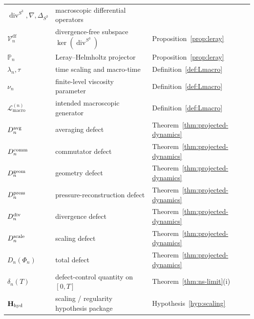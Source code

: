 \documentclass[11pt, a4paper]{amsart}
\theoremstyle{definition}
\newcommand{\Lmacro}{\mathcal L_{\mathrm{macro}}}
\newcommand{\divS}{\operatorname{div}^{S^3}}
\newcommand{\LapS}{\Delta_{S^3}}
\newcommand{\Projn}{\mathbb P_n}
\newcommand{\Vdf}{\mathcal V_n^{\mathrm{df}}}
\begin{document}
\begin{center}
\begin{tabular}{|l|l|l|}
$\divS, \nabla, \LapS$ & macroscopic differential operators
  & \\
$\Vdf$ & divergence-free subspace $\ker(\divS)$ &
  Proposition~\ref{prop:leray} \\
$\Projn$ & Leray--Helmholtz projector &
  Proposition~\ref{prop:leray} \\
$\lambda_n, \tau$ & time scaling and macro-time &
  Definition~\ref{def:Lmacro} \\
$\nu_n$ & finite-level viscosity parameter &
  Definition~\ref{def:Lmacro} \\
$\Lmacro^{(n)}$ & intended macroscopic generator &
  Definition~\ref{def:Lmacro} \\
$D_n^{\rm avg}$ & averaging defect &
  Theorem~\ref{thm:projected-dynamics} \\
$D_n^{\rm comm}$ & commutator defect &
  Theorem~\ref{thm:projected-dynamics} \\
$D_n^{\rm geom}$ & geometry defect &
  Theorem~\ref{thm:projected-dynamics} \\
$D_n^{\rm press}$ & pressure-reconstruction defect &
  Theorem~\ref{thm:projected-dynamics} \\
$D_n^{\rm div}$ & divergence defect &
  Theorem~\ref{thm:projected-dynamics} \\
$D_n^{\rm scale}$ & scaling defect &
  Theorem~\ref{thm:projected-dynamics} \\
$D_n(\Phi_n)$ & total defect &
  Theorem~\ref{thm:projected-dynamics} \\
$\delta_n(T)$ & defect-control quantity on $[0, T]$ &
  Theorem~\ref{thm:ns-limit}(i) \\
$\mathbf H_{\rm hyd}$ & scaling / regularity hypothesis package
  & Hypothesis~\ref{hyp:scaling} \\
\hline
\end{tabular}
\end{center}
\end{document}
